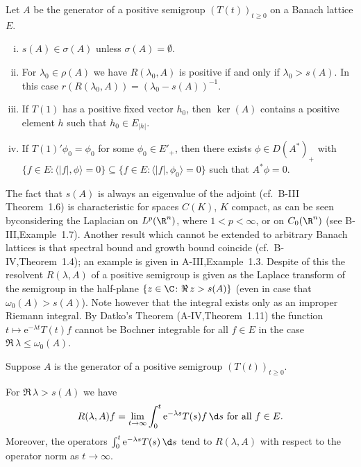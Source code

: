 \begin{theorem}\label{thm:c3-1.1}
	Let $A$ be the generator of a positive semigroup $(T(t))_{t \geq 0}$ on a Banach lattice $E$.
	
	\begin{enumerate}[(i)]
		\item 
		$s(A) \in \sigma(A)$ unless $\sigma(A) = \emptyset$.
		
		\item 
		For $\lambda_{0} \in \rho(A)$ we have
		$R(\lambda_{0},A)$ is positive if and only if $\lambda_{0} > s(A)$.
		In this case $r(R(\lambda_{0},A)) = (\lambda_{0} - s(A))^{-1}$.
		
		\item 
		If $T(1)$ has a positive fixed vector $h_{0}$, then $\ker(A)$ contains a positive element $h$ such that $h_{0} \in E_{|h|}$.

%
		\item 
		If $T(1)'\phi_{0} = \phi_{0}$ for some $\phi_{0} \in E'_{+}$, then there exists $\phi \in D(A^*)_{+}$ with $\{f \in E \colon \langle |f|,\phi\rangle = 0\} \subseteq \{f \in E \colon \langle |f|,\phi_{0}\rangle = 0\}$ such that $A^*\phi = 0$.
	\end{enumerate}
\end{theorem}

The fact that $s(A)$ is always an eigenvalue of the adjoint (cf.\ B-III Theorem~1.6) is characteristic for spaces $C(K)$, $K$ compact, as can be seen byconsidering the Laplacian on $L^p(\R ^n)$, where $1 < p < \infty$, or on $C_{0}(\R ^n)$ (see B-III,Example~1.7).
Another result which cannot be extended to arbitrary Banach lattices is that spectral bound and growth bound coincide (cf.\ B-IV,Theorem~1.4); an example is given in A-III,Example~1.3.
Despite of this the resolvent $R(\lambda,A)$ of a positive semigroup is given as the Laplace transform of the semigroup in the half-plane $\{z \in \C  \colon \Re\, z > s(A)\}$ (even in case that $\omega_0(A) > s(A)$).
Note however that the integral exists only as an improper Riemann integral.
By Datko's Theorem (A-IV,Theorem~1.11) the function $t \mapsto \mathrm{e}^{-\lambda t}T(t)f$ cannot be Bochner integrable for all $f \in E$ in the case $\Re\, \lambda \leq \omega_0(A)$.

\begin{theorem}\label{thm:c3-1.2}
	Suppose $A$ is the generator of a positive semigroup $(T(t))_{t\geq 0}$.
	
	For $\Re\,\lambda > s(A)$ we have
	\begin{equation}\label{eq:c3-1.1}
		R(\lambda,A)f = \lim_{t\to\infty} \int_{0}^t \mathrm{e}^{-\lambda s} T(s)f \,\d s \text{ for all } f \in E.
	\end{equation}
	Moreover, the operators $\int_{0}^t \mathrm{e}^{-\lambda s} T(s) \,\d s$ tend to $R(\lambda,A)$ with respect to the operator norm as $t \to \infty$.
\end{theorem}

